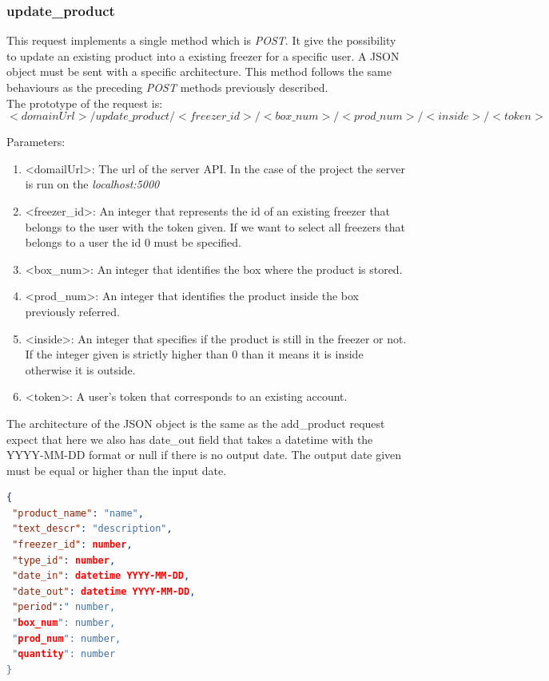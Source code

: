 \subsubsection{update\_product}
This request implements a single method which is \textit{POST}. It give the possibility to update an existing product into a existing freezer for a specific user. A JSON object must be sent with a specific architecture. This method follows the same behaviours as the preceding \textit{POST} methods previously described.\\

The prototype of the request is:
$$<domainUrl>/update\_product/<freezer\_id>/<box\_num>/<prod\_num>/<inside>/<token>$$

Parameters:
\begin{enumerate}
\item <domailUrl>: The url of the server API. In the case of the project the server is run on the \textit{localhost:5000}
\item <freezer\_id>: An integer that represents the id of an existing freezer that belongs to the user with the token given. If we want to select all freezers that belongs to a user the id 0 must be specified.
\item <box\_num>: An integer that identifies the box where the product is stored.
\item <prod\_num>: An integer that identifies the product inside the box previously referred.
\item <inside>: An integer that specifies if the product is still in the freezer or not. If the integer given is strictly higher than 0 than it means it is inside otherwise it is outside.
\item <token>: A user's token that corresponds to an existing account.
\end{enumerate}

The architecture of the JSON object is the same as the add\_product request expect that here we also has date\_out field that takes a datetime with the YYYY-MM-DD format or null if there is no output date. The output date given must be equal or higher than the input date.
\begin{lstlisting}[language=json]
{
 "product_name": "name",
 "text_descr": "description",
 "freezer_id": number,
 "type_id": number,
 "date_in": datetime YYYY-MM-DD,
 "date_out": datetime YYYY-MM-DD,
 "period":" number,
 "box_num": number,
 "prod_num": number,
 "quantity": number
}
\end{lstlisting}


